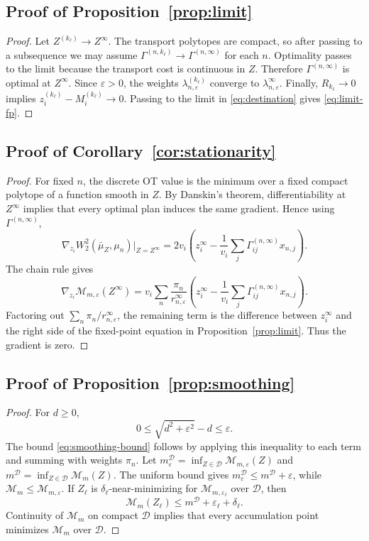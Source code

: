 \documentclass[pdflatex,sn-mathphys-ay]{sn-jnl}%
\theoremstyle{thmstyleone}%
\theoremstyle{thmstyletwo}%
\theoremstyle{thmstylethree}%
\newcommand{\calM}{\mathcal M}
\newcommand{\eps}{\varepsilon}
\newcommand{\barmu}{\bar\mu}
\begin{document}
\begin{appendices}
\subsection{Proof of Proposition~\ref{prop:limit}}
\begin{proof}
Let \(Z^{(k_\ell)}\to Z^\infty\). The transport polytopes are compact, so after passing to a subsequence we may assume \(\Gamma^{(n,k_\ell)}\to\Gamma^{(n,\infty)}\) for each \(n\). Optimality passes to the limit because the transport cost is continuous in \(Z\). Therefore \(\Gamma^{(n,\infty)}\) is optimal at \(Z^\infty\). Since \(\eps>0\), the weights \(\lambda_{n,\eps}^{(k_\ell)}\) converge to \(\lambda_{n,\eps}^\infty\). Finally, \(R_{k_\ell}\to0\) implies \(z_i^{(k_\ell)}-M_i^{(k_\ell)}\to0\). Passing to the limit in \eqref{eq:destination} gives \eqref{eq:limit-fp}.
\end{proof}

\subsection{Proof of Corollary~\ref{cor:stationarity}}
\begin{proof}
For fixed \(n\), the discrete OT value is the minimum over a fixed compact polytope of a function smooth in \(Z\). By Danskin's theorem, differentiability at \(Z^\infty\) implies that every optimal plan induces the same gradient. Hence using \(\Gamma^{(n,\infty)}\),
\[
\nabla_{z_i}W_2^2(\barmu_Z,\mu_n)\big|_{Z=Z^\infty}
=
2v_i\left(z_i^\infty-\frac{1}{v_i}\sum_j\Gamma_{ij}^{(n,\infty)}x_{n,j}\right).
\]
The chain rule gives
\[
\nabla_{z_i}\calM_{m,\eps}(Z^\infty)
=
 v_i\sum_n\frac{\pi_n}{r_{n,\eps}^\infty}
\left(z_i^\infty-\frac{1}{v_i}\sum_j\Gamma_{ij}^{(n,\infty)}x_{n,j}\right).
\]
Factoring out \(\sum_n\pi_n/r_{n,\eps}^\infty\), the remaining term is the difference between \(z_i^\infty\) and the right side of the fixed-point equation in Proposition~\ref{prop:limit}. Thus the gradient is zero.
\end{proof}


\subsection{Proof of Proposition~\ref{prop:smoothing}}
\begin{proof}
For \(d\ge0\),
\[
0\le \sqrt{d^2+\eps^2}-d\le\eps.
\]
The bound \eqref{eq:smoothing-bound} follows by applying this inequality to each term and summing with weights \(\pi_n\). Let \(m_\eps^{\mathcal D}=\inf_{Z\in\mathcal D}\calM_{m,\eps}(Z)\) and \(m^{\mathcal D}=\inf_{Z\in\mathcal D}\calM_m(Z)\). The uniform bound gives \(m_\eps^{\mathcal D}\le m^{\mathcal D}+\eps\), while \(\calM_m\le\calM_{m,\eps}\). If \(Z_\ell\) is \(\delta_\ell\)-near-minimizing for \(\calM_{m,\eps_\ell}\) over \(\mathcal D\), then
\[
\calM_m(Z_\ell)\le m^{\mathcal D}+\eps_\ell+\delta_\ell.
\]
Continuity of \(\calM_m\) on compact \(\mathcal D\) implies that every accumulation point minimizes \(\calM_m\) over \(\mathcal D\).
\end{proof}


\end{appendices}
\end{document}

